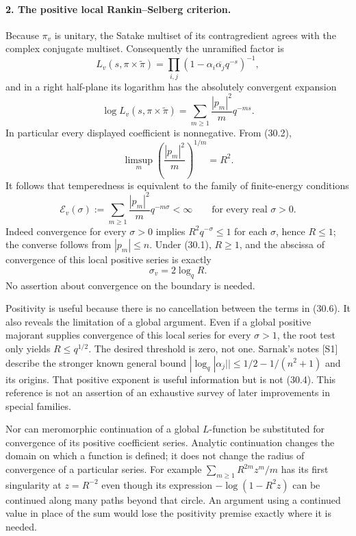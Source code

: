 \documentclass[11pt]{article}
\begin{document}
\paragraph{2. The positive local Rankin--Selberg criterion.}
Because $\pi_v$ is unitary, the Satake multiset of its contragredient agrees
with the complex conjugate multiset. Consequently the unramified factor is
\[
 L_v(s,\pi\times\widetilde\pi)
   =\prod_{i,j}(1-\alpha_i\overline{\alpha_j}q^{-s})^{-1},
\]
and in a right half-plane its logarithm has the absolutely convergent
expansion
\[
 \log L_v(s,\pi\times\widetilde\pi)
   =\sum_{m\geq1}\frac{|p_m|^2}{m}q^{-ms}.
 \tag{30.5}
\]
In particular every displayed coefficient is nonnegative. From (30.2),
\[
 \limsup_m\left(\frac{|p_m|^2}{m}\right)^{1/m}=R^2.
\]
It follows that temperedness is equivalent to the family of finite-energy
conditions
\[
 \mathcal E_v(\sigma):=
 \sum_{m\geq1}\frac{|p_m|^2}{m}q^{-m\sigma}<\infty
 \qquad\text{for every real }\sigma>0.
 \tag{30.6}
\]
Indeed convergence for every $\sigma>0$ implies
$R^2q^{-\sigma}\leq1$ for each $\sigma$, hence $R\leq1$; the converse
follows from $|p_m|\leq n$. Under (30.1), $R\geq1$, and the abscissa of
convergence of this local positive series is exactly
\[
 \sigma_v=2\log_q R.
 \tag{30.7}
\]
No assertion about convergence on the boundary is needed.

Positivity is useful because there is no cancellation between the terms in
(30.6). It also reveals the limitation of a global argument. Even if a
global positive majorant supplies convergence of this local series for
every $\sigma>1$, the root test only yields $R\leq q^{1/2}$. The desired
threshold is zero, not one. Sarnak's notes [S1] describe the stronger known
general bound $|\log_q|\alpha_j||\leq1/2-1/(n^2+1)$ and its origins.
That positive exponent is useful information but is not (30.4).
This reference is not an assertion of an exhaustive survey of later
improvements in special families.

Nor can meromorphic continuation of a global $L$-function be substituted for
convergence of its positive coefficient series. Analytic continuation changes
the domain on which a function is defined; it does not change the radius of
convergence of a particular series. For example $\sum_{m\geq1}R^{2m}z^m/m$
has its first singularity at $z=R^{-2}$ even though its expression
$-\log(1-R^2z)$ can be continued along many paths beyond that circle.
An argument using a continued value in place of the sum would lose the
positivity premise exactly where it is needed.
\end{document}
